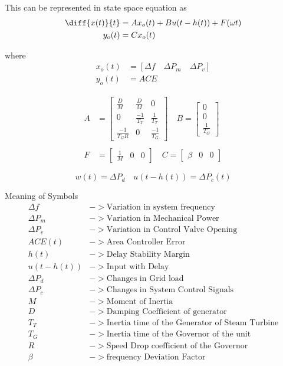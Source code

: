 \documentclass[journal]{IEEEtran}
\begin{document}
This can be represented in state space equation as
\begin{align}
  \diff{x(t)}{t} &= Ax_o(t) + Bu(t- h(t)) + F(\omega{t}) \\
  y_o(t) &= Cx_o(t)
\end{align}

where
\begin{align}
  x_o(t) &= [\Delta f \quad  \Delta P_m  \quad \Delta P_v]  \\
  y_o(t) &= ACE
\end{align}

\begin{align}
  A &=
\begin{bmatrix}
  \frac{D}{M} & \frac{D}{M} & 0 \\
  0 & \frac{-1}{T_T} & \frac{1}{T_T} \\
  \frac{-1}{T_GR} & 0 & \frac{-1}{T_G}
\end{bmatrix}
\quad
  B =
\begin{bmatrix}
  0 \\
  0 \\
  \frac{1}{T_G}
\end{bmatrix}
\\ \\
  F &=
\begin{bmatrix}
  \frac{1}{M} & 0 & 0
\end{bmatrix}
\quad
  C = 
\begin{bmatrix}
  \beta & 0 & 0
\end{bmatrix}
\end{align}

\begin{equation}
w(t) = \Delta P_d \quad u(t-h(t)) = \Delta P_c(t)
\end{equation}

Meaning of Symbols
\begin{align}
  \Delta f &-> \text{Variation in system frequency}  \\
  \Delta P_m &-> \text{Variation in Mechanical Power} \\
  \Delta P_v &-> \text{Variation in Control Valve Opening} \\
  ACE(t) &-> \text{Area Controller Error} \\
  h(t) &-> \text{Delay Stability Margin} \\
  u(t-h(t)) &-> \text{Input with Delay} \\
  \Delta P_d &-> \text{Changes in Grid load} \\
  \Delta P_c &-> \text{Changes in System Control  Signals} \\
  M &-> \text{Moment of Inertia} \\
  D &-> \text{Damping Coefficient of generator} \\
  T_T &-> \text{Inertia time of the Generator of Steam Turbine} \\
  T_G &-> \text{Inertia time of the Governor of the unit } \\
  R &-> \text{Speed Drop coefficient of the Governor} \\
  \beta &-> \text{frequency Deviation Factor} 
\end{align} 
\end{document}
